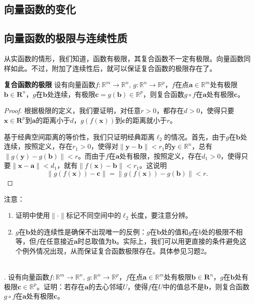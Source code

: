 \documentclass[12pt,UTF8]{ctexbook}
\begin{document}
\begin{appendix}

\chapter{向量函数的变化}

\section{向量函数的极限与连续性质}

从实函数的情形，我们知道，函数有极限，其复合函数不一定有极限。向量函数同样如此。不过，附加了连续性后，就可以保证复合函数的极限存在了。
\begin{tm}{\textbf{复合函数的极限}}
    设有向量函数$f:\mathbb{R}^m \rightarrow \mathbb{R}^n, \, g: \mathbb{R}^n \rightarrow \mathbb{R}^p$，$f$在点$\mathbf{a}\in\mathbb{R}^m$处有极限$\mathbf{b}\in\mathbf{R}^n$，$g$在$\mathbf{b}$处连续，有极限$\mathbf{c} = g(\mathbf{b})\in \mathbb{R}^p$，则复合函数$g\circ f$在$\mathbf{a}$处有极限$\mathbf{c}$。
\end{tm}
\begin{proof}
    根据极限的定义，我们要证明，对任意$r>0$，都存在$d>0$，使得只要$\mathbf{x}\in\mathbf{R}^p$到$\mathbf{a}$的距离小于$d$，$g(f(\mathbf{x}))$到$\mathbf{c}$的距离就小于$r$。

    基于经典空间距离的等价性，我们只证明经典距离$\ell_2$的情况。首先，由于$g$在$\mathbf{b}$处连续，按照定义，存在$r_1>0$，使得对$\|\mathbf{y} - \mathbf{b}\| < r_1$的$\mathbf{y}\in\mathbb{R}^n$，总有$\|g(\mathbf{y}) - g(\mathbf{b}) \| < r$。而由于$f$在$\mathbf{a}$处有极限，按照定义，存在$d_1 > 0$，使得只要$\|\mathbf{x} - \mathbf{a}\| < d_1$，就有$\| f(\mathbf{x}) - \mathbf{b}\| < r_1$。这说明
    $$\| g(f(\mathbf{x})) - \mathbf{c}\| = \| g(f(\mathbf{x})) - g(\mathbf{b})\| < r.$$
\end{proof}

注意：
\begin{enumerate}[label=\arabic*.]
    \item 证明中使用$\|\cdot\|$标记不同空间中的$\ell_2$长度，要注意分辨。
    \item $g$在$\mathbf{b}$处的连续性是确保不出现唯一的反例：$g$在$\mathbf{b}$处的值和$g$在$b$处的极限不相等，但$f$在任意接近$\mathbf{a}$时总取值为$\mathbf{b}$。实际上，我们可以用更直接的条件避免这个例外情况出现，从而保证复合函数极限存在。具体参见习题2。
\end{enumerate}

\begin{xt}
    \mbox{} \\
    . 设有向量函数$f:\mathbb{R}^m \rightarrow \mathbb{R}^n, \, g: \mathbb{R}^n \rightarrow \mathbb{R}^p$，$f$在点$\mathbf{a}\in\mathbb{R}^m$处有极限$\mathbf{b}\in\mathbf{R}^n$，$g$在$\mathbf{b}$处有极限$\mathbf{c}\in \mathbb{R}^p$。证明：若存在$\mathbf{a}$的去心邻域$U$，使得$f$在$U$中的值总不是$\mathbf{b}$，则复合函数$g\circ f$在$\mathbf{a}$处有极限$\mathbf{c}$。
\end{xt}


\end{appendix}
\end{document}
